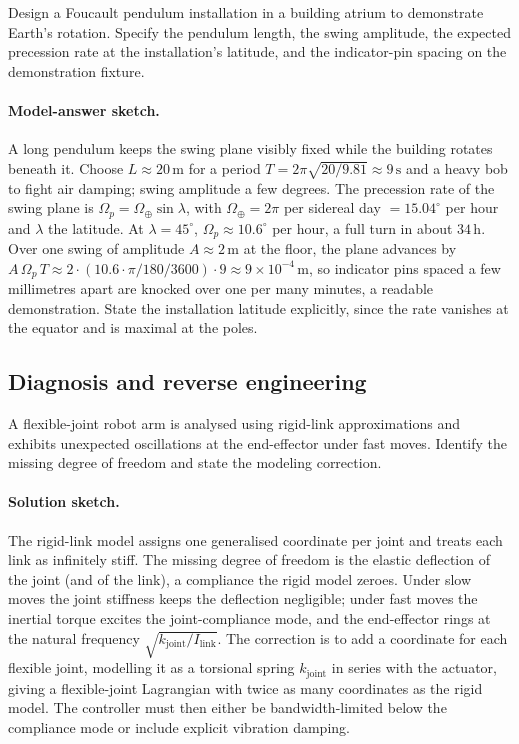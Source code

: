\begin{exercise}
Design a Foucault pendulum installation in a building atrium to
demonstrate Earth's rotation. Specify the pendulum length, the
swing amplitude, the expected precession rate at the installation's
latitude, and the indicator-pin spacing on the demonstration
fixture.

\paragraph{Model-answer sketch.} A long pendulum keeps the swing plane
visibly fixed while the building rotates beneath it. Choose $L \approx
20\,\si{\meter}$ for a period $T = 2\pi\sqrt{20/9.81} \approx
9\,\si{\second}$ and a heavy bob to fight air damping; swing amplitude a
few degrees. The precession rate of the swing plane is $\Omega_p =
\Omega_\oplus\sin\lambda$, with $\Omega_\oplus = 2\pi$ per sidereal day
$= 15.04^\circ$ per hour and $\lambda$ the latitude. At $\lambda =
45^\circ$, $\Omega_p \approx 10.6^\circ$ per hour, a full turn in about
$34\,\si{\hour}$. Over one swing of amplitude $A \approx 2\,\si{\meter}$
at the floor, the plane advances by $A\,\Omega_p\,T \approx 2\cdot
(10.6\cdot\pi/180/3600)\cdot 9 \approx 9\times 10^{-4}\,\si{\meter}$, so
indicator pins spaced a few millimetres apart are knocked over one per
many minutes, a readable demonstration. State the installation latitude
explicitly, since the rate vanishes at the equator and is maximal at the
poles.
\end{exercise}

\subsection*{Diagnosis and reverse engineering}

\begin{exercise}
A flexible-joint robot arm is analysed using rigid-link approximations
and exhibits unexpected oscillations at the end-effector under fast
moves. Identify the missing degree of freedom and state the modeling
correction.

\paragraph{Solution sketch.} The rigid-link model assigns one
generalised coordinate per joint and treats each link as
infinitely stiff. The missing degree of freedom is the elastic
deflection of the joint (and of the link), a compliance the rigid model
zeroes. Under slow moves the joint stiffness keeps the deflection
negligible; under fast moves the inertial torque excites the
joint-compliance mode, and the end-effector rings at the natural
frequency $\sqrt{k_\text{joint}/I_\text{link}}$. The correction is to add
a coordinate for each flexible joint, modelling it as a torsional spring
$k_\text{joint}$ in series with the actuator, giving a flexible-joint
Lagrangian with twice as many coordinates as the rigid model. The
controller must then either be bandwidth-limited below the compliance
mode or include explicit vibration damping.
\end{exercise}

